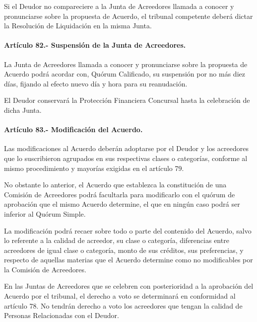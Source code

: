 \documentclass[
]{book}
\begin{document}
Si el Deudor no compareciere a la Junta de Acreedores llamada a conocer y pronunciarse sobre la propuesta de Acuerdo, el tribunal competente deberá dictar la Resolución de Liquidación en la misma Junta.

\hypertarget{artuxedculo-82.--suspensiuxf3n-de-la-junta-de-acreedores.}{%
\paragraph*{Artículo 82.- Suspensión de la Junta de Acreedores.}\label{artuxedculo-82.--suspensiuxf3n-de-la-junta-de-acreedores.}}

La Junta de Acreedores llamada a conocer y pronunciarse sobre la propuesta de Acuerdo podrá acordar con, Quórum Calificado, su suspensión por no más diez días, fijando al efecto nuevo día y hora para su reanudación.

El Deudor conservará la Protección Financiera Concursal hasta la celebración de dicha Junta.

\hypertarget{artuxedculo-83.--modificaciuxf3n-del-acuerdo.}{%
\paragraph*{Artículo 83.- Modificación del Acuerdo.}\label{artuxedculo-83.--modificaciuxf3n-del-acuerdo.}}

Las modificaciones al Acuerdo deberán adoptarse por el Deudor y los acreedores que lo suscribieron agrupados en sus respectivas clases o categorías, conforme al mismo procedimiento y mayorías exigidas en el artículo 79.

No obstante lo anterior, el Acuerdo que establezca la constitución de una Comisión de Acreedores podrá facultarla para modificarlo con el quórum de aprobación que el mismo Acuerdo determine, el que en ningún caso podrá ser inferior al Quórum Simple.

La modificación podrá recaer sobre todo o parte del contenido del Acuerdo, salvo lo referente a la calidad de acreedor, su clase o categoría, diferencias entre acreedores de igual clase o categoría, monto de sus créditos, sus preferencias, y respecto de aquellas materias que el Acuerdo determine como no modificables por la Comisión de Acreedores.

En las Juntas de Acreedores que se celebren con posterioridad a la aprobación del Acuerdo por el tribunal, el derecho a voto se determinará en conformidad al artículo 78. No tendrán derecho a voto los acreedores que tengan la calidad de Personas Relacionadas con el Deudor.
\end{document}
